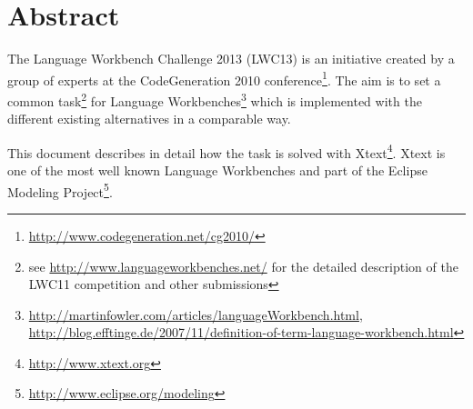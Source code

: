 \section*{Abstract}
The Language Workbench Challenge 2013 (LWC13) is an initiative created by a
group of experts at the CodeGeneration 2010
conference\footnote{\url{http://www.codegeneration.net/cg2010/}}. The aim is to
set a common task\footnote{see \url{http://www.languageworkbenches.net/} for the
detailed description of the LWC11 competition and other submissions}
for Language Workbenches\footnote{\url{http://martinfowler.com/articles/languageWorkbench.html},
\url{http://blog.efftinge.de/2007/11/definition-of-term-language-workbench.html}}
which is implemented with the different existing alternatives in a comparable
way.

This document describes in detail how the task is solved with
Xtext\footnote{\url{http://www.xtext.org}}. Xtext is one of the most well known
Language Workbenches and part of the Eclipse Modeling
Project\footnote{\url{http://www.eclipse.org/modeling}}.

